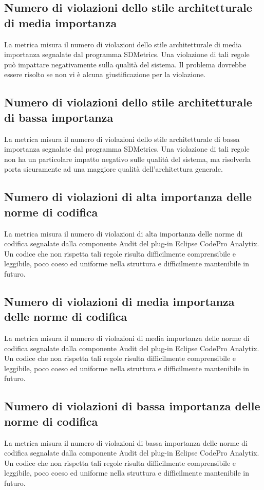 \subsection{Numero di violazioni dello stile architetturale di media importanza}
La metrica misura il numero di violazioni dello stile architetturale di media importanza segnalate dal programma SDMetrics. Una violazione di tali regole può impattare negativamente sulla qualità del sistema. Il problema dovrebbe essere risolto se non vi è alcuna giustificazione per la violazione.


\subsection{Numero di violazioni dello stile architetturale di bassa importanza}
La metrica misura il numero di violazioni dello stile architetturale di bassa importanza segnalate dal programma SDMetrics. Una violazione di tali regole non ha un particolare impatto negativo sulle qualità del sistema, ma risolverla porta sicuramente ad una maggiore qualità dell'architettura generale.


\subsection{Numero di violazioni di alta importanza delle norme di codifica}
La metrica misura il numero di violazioni di alta importanza delle norme di codifica segnalate dalla componente Audit del plug-in Eclipse CodePro Analytix. Un codice che non rispetta tali regole risulta difficilmente comprensibile e leggibile, poco coeso ed uniforme nella struttura e difficilmente mantenibile in futuro.


\subsection{Numero di violazioni di media importanza delle norme di codifica}
La metrica misura il numero di violazioni di media importanza delle norme di codifica segnalate dalla componente Audit del plug-in Eclipse CodePro Analytix. Un codice che non rispetta tali regole risulta difficilmente comprensibile e leggibile, poco coeso ed uniforme nella struttura e difficilmente mantenibile in futuro.


\subsection{Numero di violazioni di bassa importanza delle norme di codifica}
La metrica misura il numero di violazioni di bassa importanza delle norme di codifica segnalate dalla componente Audit del plug-in Eclipse CodePro Analytix. Un codice che non rispetta tali regole risulta difficilmente comprensibile e leggibile, poco coeso ed uniforme nella struttura e difficilmente mantenibile in futuro.



